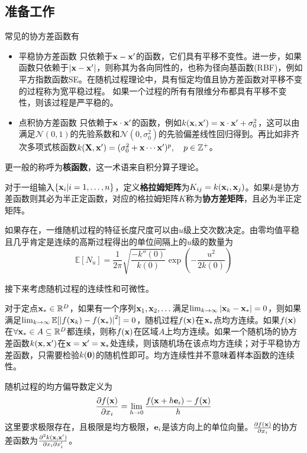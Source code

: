 \documentclass[12pt,UTF8]{article}
\begin{document}
        \subsection{准备工作}
            常见的协方差函数有
            \begin{itemize}
                \item{平稳协方差函数} 只依赖于$\vb{x}-\vb{x}'$的函数，它们具有平移不变性。进一步，如果函数只依赖于$\abs{\vb{x}-\vb{x}'}$，则称其为各向同性的，也称为径向基函数(RBF)，例如平方指数函数SE。在随机过程理论中，具有恒定均值且协方差函数对平移不变的过程称为宽平稳过程。 如果一个过程的所有有限维分布都具有平移不变性，则该过程是严平稳的。
                \item{点积协方差函数} 只依赖于$\vb{x}\cdot\vb{x}'$的函数，例如$k(\vb{x},\vb{x}')=\vb{x}\cdot\vb{x}'+\sigma_0^2$，这可以由满足$\mathcal{N}(0,1)$的先验系数和$\mathcal{N}(0,\sigma_0^2)$的先验偏差线性回归得到。再比如非齐次多项式核函数$k(\vb{X},\vb{x}')=(\sigma_0^2+\vb{x}\cdots\vb{x}')^p\qc p\in\mathbb{Z}^+$。
            \end{itemize}\par
            更一般的称呼为\textbf{核函数}，这一术语来自积分算子理论。\par
            对于一组输入$\{\vb{x}_i|i=1,\dots,n\}$，定义\textbf{格拉姆矩阵}为$K_{ij}=k(\vb{x}_i,\vb{x}_j)$。如果$k$是协方差函数则其必为半正定函数，对应的格拉姆矩阵$K$称为\textbf{协方差矩阵}，且必为半正定矩阵。\par
            如果存在，一维随机过程的特征长度尺度可以由$u$级上交次数决定。由零均值平稳且几乎肯定是连续的高斯过程得出的单位间隔上的$u$级的数量为
            \begin{equation}
                \mathbb{E}[N_u]=\frac{1}{2\pi}\sqrt{\frac{-k''(0)}{k(0)}}\exp(-\frac{u^2}{2k(0)})
            \end{equation}\par
            接下来考虑随机过程的连续性和可微性。\par
            对于定点$\vb{x}_*\in\mathbb{R}^D$，如果有一个序列$\vb{x}_1,\vb{x}_2,\dots$满足$\lim_{k\rightarrow\infty}{\abs{\vb{x}_k-\vb{x}_*}}=0$，则如果满足$\lim_{k\rightarrow\infty}{\mathbb{E}[\abs{f(\vb{x}_k)-f(\vb{x}_*)}^2]}=0$，随机过程$f(\vb{x})$在$\vb{x}_*$点均方连续。如果$f(\vb{x})$在$\forall \vb{x}_*\in A\subseteq\mathbb{R}^D$都连续，则称$f(\vb{x})$在区域$A$上均方连续。如果一个随机场的协方差函数$k(\vb{x},\vb{x}')$在$\vb{x}=\vb{x}'=\vb{x}_*$处连续，则该随机场在该点均方连续；对于平稳协方差函数，只需要检验$k(\vb{0})$的随机性即可。均方连续性并不意味着样本函数的连续性。\par
            随机过程的均方偏导数定义为
            \begin{equation}
                \pdv{f(\vb{x})}{x_i}=\lim_{h\rightarrow 0}{\frac{f(\vb{x}+h\vb{e}_i)-f(\vb{x})}{h}}
            \end{equation}
            这里要求极限存在，且极限是均方极限，$\vb{e}_i$是该方向上的单位向量。$\pdv{f(\vb{x})}{x_i}$的协方差函数为$\pdv{k(\vb{x},\vb{x}')}{x_i}{x'_i}$。
\end{document}
